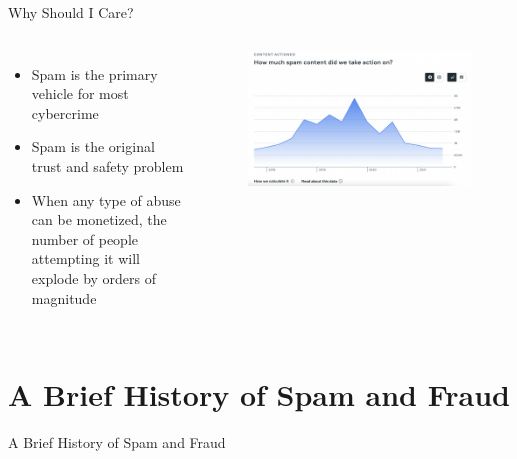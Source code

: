 \documentclass[nobackground,dvipsnames,table]{beamer}
\begin{document}
\begin{frame}{Why Should I Care?}
    \begin{columns}
            \begin{itemize}
                \item Spam is the primary vehicle for most cybercrime
                \item Spam is the original trust and safety problem
                \item When any type of abuse can be monetized, the number of people attempting it will explode by orders of magnitude
            \end{itemize}
            \begin{figure}
                \centering
                \includegraphics[width=\textwidth]{spam-content-removed}
            \end{figure}
    \end{columns}
\end{frame}

\section{A Brief History of Spam and Fraud}
\begin{frame}{}
    A Brief History of Spam and Fraud
\end{frame}
\end{document}
